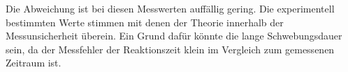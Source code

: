 Die Abweichung ist bei diesen Messwerten auffällig gering. Die experimentell bestimmten Werte stimmen mit denen der Theorie innerhalb der Messunsicherheit überein. 
Ein Grund dafür könnte die lange Schwebungsdauer sein, da der Messfehler der Reaktionszeit klein im Vergleich zum gemessenen Zeitraum ist.  
%
%



